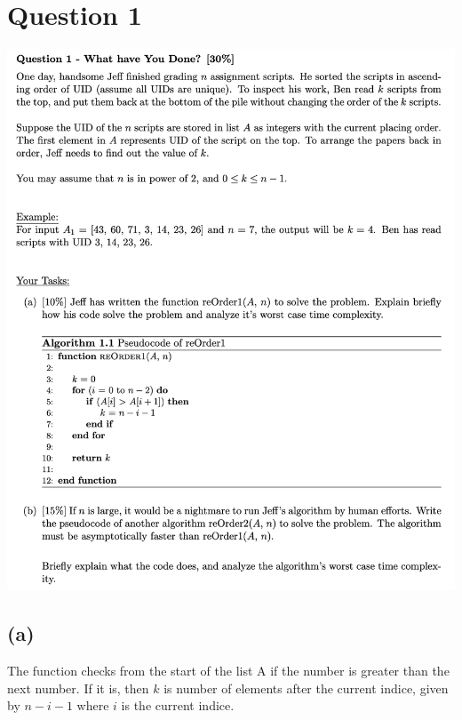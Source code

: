 \documentclass{article}
\begin{document}



\section*{Question 1}

\begin{center}
    \includegraphics[width=\linewidth]{img/1.png}
\end{center}

\subsection*{(a)}
The function checks from the start of the list A if the number is greater than the next number. If it is, then $k$ is number of elements after the current indice, given by $n-i-1$ where $i$ is the current indice.
\end{document}
